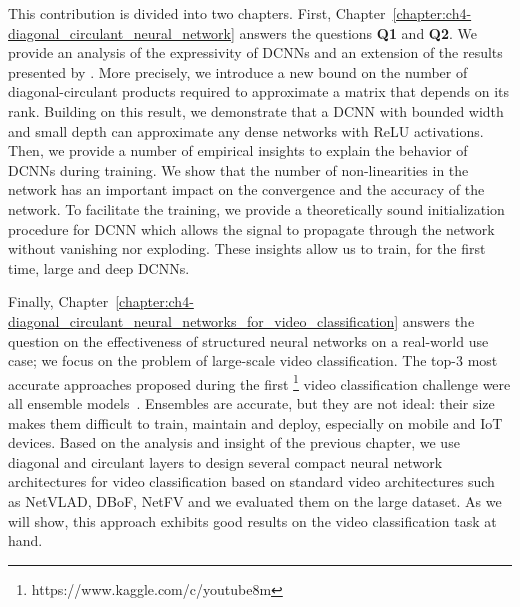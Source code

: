 This contribution is divided into two chapters.
First, Chapter~\ref{chapter:ch4-diagonal_circulant_neural_network} answers the questions \textbf{Q1} and \textbf{Q2}.
We provide an analysis of the expressivity of DCNNs and an extension of the results presented by \citet{huhtanen2015factoring}.
More precisely, we introduce a new bound on the number of diagonal-circulant products required to approximate a matrix that depends on its rank.
Building on this result, we demonstrate that a DCNN with bounded width and small depth can approximate any dense networks with ReLU activations.
Then, we provide a number of empirical insights to explain the behavior of DCNNs during training.
We show that the number of non-linearities in the network has an important impact on the convergence and the accuracy of the network.
To facilitate the training, we provide a theoretically sound initialization procedure for DCNN which allows the signal to propagate through the network without vanishing nor exploding.
These insights allow us to train, for the first time, large and deep DCNNs.

Finally, Chapter~\ref{chapter:ch4-diagonal_circulant_neural_networks_for_video_classification} answers the question on the effectiveness of structured neural networks on a real-world use case;
we focus on the problem of large-scale video classification. 
The top-3 most accurate approaches proposed during the first \yt\footnote{https://www.kaggle.com/c/youtube8m} video classification challenge  were all ensemble models~\cite{miech2017learnable,wang2017monkeytyping,li2017temporal}.
Ensembles are accurate, but they are not ideal: their size makes them difficult to train, maintain and deploy, especially on mobile and IoT devices. 
Based on the analysis and insight of the previous chapter, we use diagonal and circulant layers to design several compact neural network architectures for video classification based on standard video architectures such as NetVLAD, DBoF, NetFV and we evaluated them on the large \yt dataset.
As we will show, this approach exhibits good results on the video classification task at hand. 




